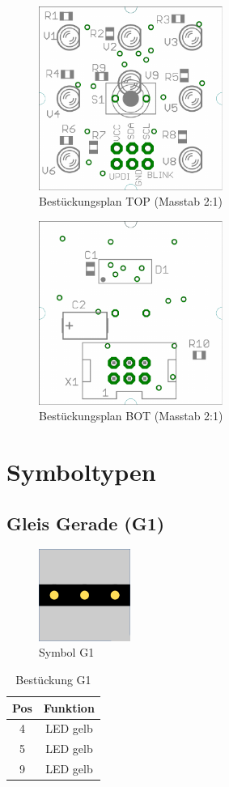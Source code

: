 \documentclass[10pt,a4paper]{article}
\begin{document}
\begin{figure}[hbtp!]
\centering
\includegraphics[width=6cm]{feld_hw_top_comp.pdf}
\caption[Bestückungsplan TOP]{Bestückungsplan TOP (Masstab 2:1)}
\end{figure}
\begin{figure}[hbtp!]
\centering
\includegraphics[width=6cm]{feld_hw_bot_comp.pdf}
\caption[Bestückungsplan BOT]{Bestückungsplan BOT (Masstab 2:1)}
\end{figure}
\newpage
\section{Symboltypen}


\subsection{Gleis Gerade (G1)}
\begin{figure}[H]
\centering
\includegraphics[width=3cm]{../folien/g1.png}
\caption{Symbol G1}
\end{figure}
\begin{table}[h!]
\centering
\begin{tabular}{c|c}
\textbf{Pos} & \textbf{Funktion} \\ \hline
4 & LED gelb \\
5 & LED gelb \\
9 & LED gelb
\end{tabular}
\caption{Bestückung G1}
\end{table}
\end{document}
